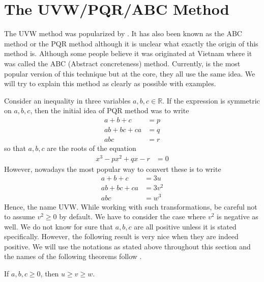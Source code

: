 \documentclass{subfile}
\begin{document}
	\section{The UVW/PQR/ABC Method}\label{sec:uvw}
	The UVW method was popularized by \textcite{rozenberg_2011}. It has also been known as the ABC method or the PQR method although it is unclear what exactly the origin of this method is. Although some people believe it was originated at Vietnam where it was called the ABC (Abstract concreteness) method. Currently, \textcite{knudsen} is the most popular version of this technique but at the core, they all use the same idea. We will try to explain this method as clearly as possible with examples.

	Consider an inequality in three variables $a,b,c\in\mathbb{R}$. If the expression is symmetric on $a,b,c$, then the initial idea of PQR method was to write
		\begin{align*}
			a+b+c
				& = p\\
			ab+bc+ca
				& = q\\
			abc
				& = r
		\end{align*}
	so that $a,b,c$ are the roots of the equation
		\begin{align*}
			x^{3}-px^{2}+qx-r
				& = 0
		\end{align*}
	However, nowadays the most popular way to convert these is to write
		\begin{align*}
			a+b+c
				& = 3u\\
			ab+bc+ca
				& = 3v^{2}\\
			abc
				& = w^{3}
		\end{align*}
	Hence, the name UVW. While working with such transformations, be careful not to assume $v^{2}\geq 0$ by default. We have to consider the case where $v^{2}$ is negative as well. We do not know for sure that $a,b,c$ are all positive unless it is stated specifically. However, the following result is very nice when they are indeed positive. We will use the notations as stated above throughout this section and the names of the following theorems follow \textcite{knudsen}.
		\begin{theorem}
			If $a,b,c\geq 0$, then $u\geq v\geq w$.
		\end{theorem}
\end{document}
